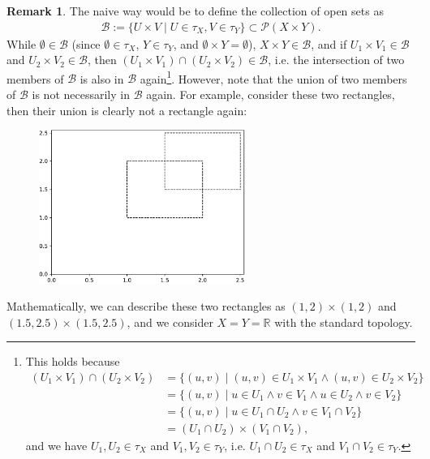 \documentclass[12pt, a4paper]{article}
\numberwithin{equation}{section}
\theoremstyle{definition}
\theoremstyle{definition}
\newtheorem{remark}[thm]{Remark} %
\begin{document}
		\begin{remark}
			The naive way would be to define the collection of open sets as 
			\begin{align}\label{eq:basis_product_topology}
				\mathscr B := \{ U\times V \mid U\in\tau_X, V\in\tau_Y \}\subset \mathcal P(X\times Y).
			\end{align}
			While $\emptyset\in\mathscr B$ (since $\emptyset\in \tau_X$, $Y\in \tau_Y$, and $\emptyset\times Y = \emptyset$), $X\times Y \in \mathscr B$, and if $U_1\times V_1\in\mathscr B$ and $U_2\times V_2\in\mathscr B$, then $(U_1\times V_1) \cap (U_2\times V_2)\in\mathscr B$, i.e. the intersection of two members of $\mathscr B$ is also in $\mathscr B$ again\footnote{This holds because 
				\begin{align*}
					(U_1 \times V_1) \cap (U_2\times V_2) &= \{(u, v) \mid (u, v)\in U_1\times V_1 \wedge (u, v)\in U_2\times V_2 \} \\ &= \{(u, v) \mid u\in U_1\wedge v\in V_1\wedge u\in U_2\wedge v\in V_2\}
					\\ &= \{(u, v)\mid u\in U_1\cap U_2 \wedge v\in V_1\cap V_2\}
					\\ &= (U_1\cap U_2) \times (V_1\cap V_2),
				\end{align*}
				and we have $U_1, U_2\in\tau_X$ and $V_1, V_2\in\tau_Y$, i.e. $U_1\cap U_2\in\tau_X$ and $V_1\cap V_2\in \tau_Y$.
			}. However, note that the union of two members of $\mathscr B$ is not necessarily in $\mathscr B$ again. For example, consider these two rectangles, then their union is clearly not a rectangle again:
			\begin{figure}[h!]
				\centering 
				\includegraphics[width=0.6\textwidth]{scripts/rectangles.pdf}
			\end{figure}
			
			Mathematically, we can describe these two rectangles as $(1, 2) \times (1, 2)$ and $(1.5, 2.5) \times (1.5, 2.5)$, and we consider $X = Y = \mathbb R$ with the standard topology.
		\end{remark}
	
\end{document}

